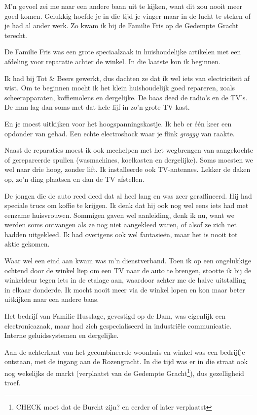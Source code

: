 \documentclass[10pt,twoside,openright]{memoir}
\begin{document}
M’n gevoel zei me naar een andere baan uit te kijken, want dit zou nooit meer goed komen. Gelukkig hoefde je in die tijd je vinger maar in de lucht te steken of je had al ander werk. Zo kwam ik bij de Familie Fris op de Gedempte Gracht terecht.

De Familie Fris was een grote speciaalzaak in huishoudelijke artikelen met een afdeling voor reparatie achter de winkel. In die laatste kon ik beginnen. 

Ik had bij Tot \& Beers gewerkt, dus dachten ze dat ik wel iets van electriciteit af wist. Om te beginnen mocht ik het klein huishoudelijk goed repareren, zoals scheerapparaten, koffiemolens en dergelijke. De baas deed de radio’s en de TV’s. De man lag dan soms met dat hele lijf in zo’n grote TV kast. 

En je moest uitkijken voor het hoogspanningskastje. Ik heb er één keer een opdonder van gehad. Een echte electroshock waar je flink \emph{groggy} van raakte.

Naast de reparaties moest ik ook meehelpen met het wegbrengen van aangekochte of gerepareerde spullen (wasmachines, koelkasten en dergelijke). Soms moesten we wel naar drie hoog, zonder lift. Ik installeerde ook TV-antennes. Lekker de daken op, zo’n ding plaatsen en dan de TV afstellen. 

De jongen die de auto reed deed dat al heel lang en was zeer geraffineerd. Hij had speciale trucs om koffie te krijgen. Ik denk dat hij ook nog wel eens iets had met eenzame huisvrouwen. Sommigen gaven wel aanleiding, denk ik nu, want we werden soms ontvangen als ze nog niet aangekleed waren, of alsof ze zich net hadden uitgekleed. Ik had overigens ook wel fantasieën, maar het is nooit tot aktie gekomen. 

Waar wel een eind aan kwam was m’n dienstverband. Toen ik op een ongelukkige ochtend door de winkel liep om een TV naar de auto te brengen, stootte ik bij de winkeldeur tegen iets in de etalage aan, waardoor achter me de halve uitstalling in elkaar donderde. Ik mocht nooit meer via de winkel lopen en kon maar beter uitkijken naar een andere baas.

Het bedrijf van Familie Husslage, gevestigd op de Dam, was eigenlijk een electronicazaak, maar had zich gespecialiseerd in industriële communicatie. Interne geluidssystemen en dergelijke. 

Aan de achterkant van het gecombineerde woonhuis en winkel was een bedrijfje ontstaan, met de ingang aan de Rozengracht. In die tijd was er in die straat ook nog wekelijks de markt (verplaatst van de Gedempte Gracht\footnote{CHECK moet dat de Burcht zijn? en eerder of later verplaatst}), dus gezelligheid troef. 
\end{document}
